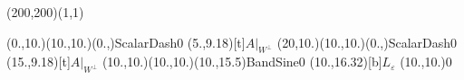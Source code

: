 \unitlength=1bp%

\begin{feynartspicture}(200,200)(1,1)

\FADiagram{}
\FAProp(0.,10.)(10.,10.)(0.,){ScalarDash}{0}
\FALabel(5.,9.18)[t]{$A|_{W^\perp}$}
\FAProp(20,10.)(10.,10.)(0.,){ScalarDash}{0}
\FALabel(15.,9.18)[t]{$A|_{W^\perp}$}
\FAProp(10.,10.)(10.,10.)(10.,15.5){BandSine}{0}
\FALabel(10.,16.32)[b]{$L_\varepsilon$}
\FAVert(10.,10.){0}
\end{feynartspicture}

